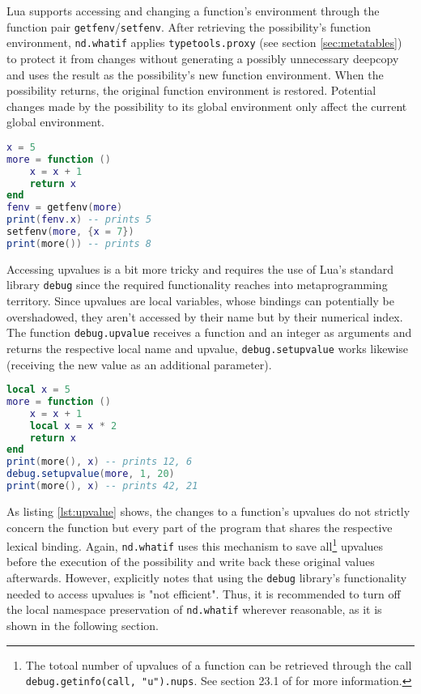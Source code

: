 Lua supports accessing and changing a function's environment through the function pair \texttt{getfenv}/\texttt{setfenv}. After retrieving the possibility's function environment, \texttt{nd.whatif} applies \texttt{typetools.proxy} (see section \ref{sec:metatables}) to protect it from changes without generating a possibly unnecessary deepcopy and uses the result as the possibility's new function environment. When the possibility returns, the original function environment is restored. Potential changes made by the possibility to its global environment only affect the current global environment.

\begin{lstlisting}[language=lua, caption={Changing a function's environment.}, label=lst:fenv, name=lst:fenv]
x = 5
more = function ()
	x = x + 1
	return x
end
fenv = getfenv(more)
print(fenv.x) -- prints 5
setfenv(more, {x = 7})
print(more()) -- prints 8
\end{lstlisting}

Accessing upvalues is a bit more tricky and requires the use of Lua's standard library \texttt{debug} since the required functionality reaches into metaprogramming territory. Since upvalues are local variables, whose bindings can potentially be overshadowed, they aren't accessed by their name but by their numerical index. The function \texttt{debug.upvalue} receives a function and an integer as arguments and returns the respective local name and upvalue, \texttt{debug.setupvalue} works likewise (receiving the new value as an additional parameter).

\begin{lstlisting}[language=lua, caption={Setting a function's upvalue "from the outside".}, label=lst:upvalue, name=lst:upvalue]
local x = 5
more = function ()
	x = x + 1
	local x = x * 2
	return x
end
print(more(), x) -- prints 12, 6
debug.setupvalue(more, 1, 20)
print(more(), x) -- prints 42, 21
\end{lstlisting}

As listing \ref{lst:upvalue} shows, the changes to a function's upvalues do not strictly concern the function but every part of the program that shares the respective lexical binding. Again, \texttt{nd.whatif} uses this mechanism to save all\footnote{The totoal number of upvalues of a function can be retrieved through the call \texttt{debug.getinfo(call, "u").nups}. See section 23.1 of \cite{Ierusalimschy2006} for more information.} upvalues before the execution of the possibility and write back these original values afterwards. However, \cite{Ierusalimschy2006} explicitly notes that using the \texttt{debug} library's functionality needed to access upvalues is "not efficient". Thus, it is recommended to turn off the local namespace preservation of \texttt{nd.whatif} wherever reasonable, as it is shown in the following section.

